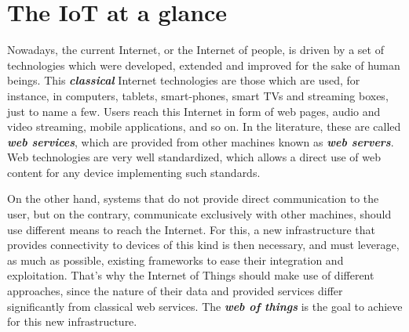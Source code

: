 


\section{The IoT at a glance}
\label{subsec:IoTAtAGlance}
Nowadays, the current Internet, or the Internet of people, is driven by a set of technologies which were developed, extended and improved for the sake of human beings.
This \textit{\textbf{classical}} Internet technologies are those which are used, for instance, in computers, tablets, smart-phones, smart TVs and streaming boxes, just to name a few.
Users reach this Internet in form of web pages, audio and video streaming, mobile applications, and so on.
In the literature, these are called \textit{\textbf{web services}}, which are provided from other machines known as \textit{\textbf{web servers}}.
Web technologies are very well standardized, which allows a direct use of web content for any device implementing such standards.

On the other hand, systems that do not provide direct communication to the user, but on the contrary, communicate exclusively with other machines, should use different means to reach the Internet.
For this, a new infrastructure that provides connectivity to devices of this kind is then necessary, and must leverage, as much as possible, existing frameworks to ease their integration and exploitation.
That's why the Internet of Things should make use of different approaches, since the nature of their data and provided services differ significantly from classical web services.
The \textit{\textbf{web of things}}\cite{duquennoy2009webofthings} is the goal to achieve for this new infrastructure.

